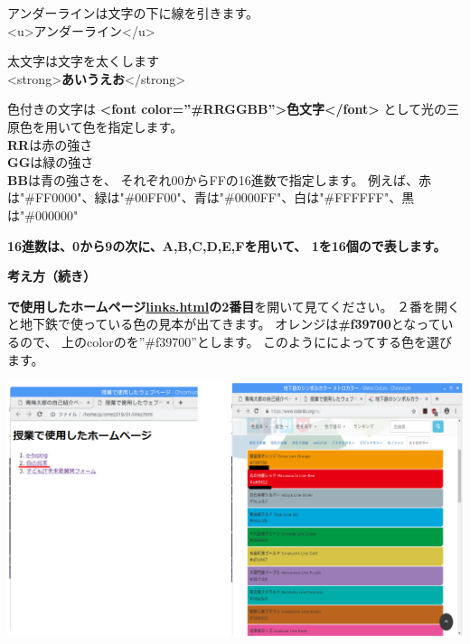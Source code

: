 \bigskip

アンダーラインは文字の下に線を引きます。\\
{\textless}u{\textgreater}アンダーライン{\textless}/u{\textgreater}\\

\bigskip

太文字は文字を太くします\\
{\textless}strong{\textgreater}\textbf{あいうえお}{\textless}/strong{\textgreater}


\bigskip
色付きの文字は
\textbf{{\textless}font color=”\#RRGGBB”{\textgreater}色文字{\textless}/font{\textgreater}}
として光の三原色を用いて色を指定します。\\
\textbf{RR}は赤の強さ\\
\textbf{GG}は緑の強さ\\
\textbf{BB}は青の強さを、
それぞれ00からFFの16進数で指定します。
例えば、赤は"\#FF0000"、緑は"\#00FF00"、青は"\#0000FF"、白は"\#FFFFFF"、黒は"\#000000"

\bigskip
\textbf{16進数は、0から9の次に、A,B,C,D,E,Fを用いて、
  1を16個ので表します。}

\bigskip



\clearpage


\textbf{考え方（続き）}



\textbf{で使用したホームページ\url{links.html}の2番目}を開いて見てください。
２番を開くと地下鉄で使っている色の見本が出てきます。
オレンジは\textbf{\#f39700}となっているので、
上のcolorのを”\#f39700”とします。
このようにによってする色を選びます。



\bigskip

\includegraphics[width=\textwidth]{text01-img/textbook-img187.png}

